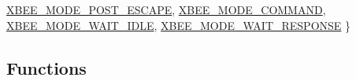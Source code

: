 \begin{DoxyCompactItemize}
\hyperlink{group__xbee__device_gga5015540d81fda839a15651ddb3fb411eafd910da7a43596621a12dcbce8410ffd}{X\+B\+E\+E\+\_\+\+M\+O\+D\+E\+\_\+\+P\+O\+S\+T\+\_\+\+E\+S\+C\+A\+PE}, 
\hyperlink{group__xbee__device_gga5015540d81fda839a15651ddb3fb411eaaa62d524055898fb85100bd2363a5802}{X\+B\+E\+E\+\_\+\+M\+O\+D\+E\+\_\+\+C\+O\+M\+M\+A\+ND}, 
\hyperlink{group__xbee__device_gga5015540d81fda839a15651ddb3fb411ea4fdf81a02970e7d090a88e16e32f8c3a}{X\+B\+E\+E\+\_\+\+M\+O\+D\+E\+\_\+\+W\+A\+I\+T\+\_\+\+I\+D\+LE}, 
\newline
\hyperlink{group__xbee__device_gga5015540d81fda839a15651ddb3fb411eaabd85cf9e660bddbe0782fb96d1b831b}{X\+B\+E\+E\+\_\+\+M\+O\+D\+E\+\_\+\+W\+A\+I\+T\+\_\+\+R\+E\+S\+P\+O\+N\+SE}
 \}
\end{DoxyCompactItemize}
\subsection*{Functions}

